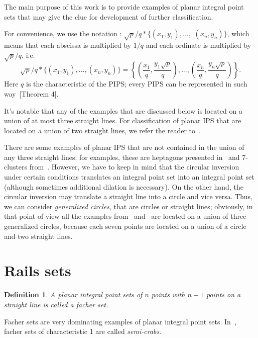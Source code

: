 \documentclass[12pt]{article}
\theoremstyle{theorem}
\theoremstyle{dfn}
\newtheorem{dfn}{Definition}
\theoremstyle{remark}
\begin{document}
The main purpose of this work is to provide examples of planar integral point sets
that may give the clue for development of further classification.

For convenience, we use the notation \cite{our-ped-2018,our-pmm-2018,our-vmmsh-2018}:
$\sqrt{p}/q * \{ (x_1,y_1), ...,$ $ (x_n, y_n)  \}$,
which means that each abscissa is multiplied by $1/q$
and each ordinate is multiplied by $\sqrt{p}/q$,  i.e.
\begin{equation}
	\label{eq:char_lattice}
	\sqrt{p}/q * \{ (x_1,y_1), ..., (x_n, y_n)  \}
	=
	\left\{ \left(\frac{x_1}{q},\frac{y_1\sqrt{p}}{q}\right), ..., \left(\frac{x_n}{q},   \frac{y_n\sqrt{p}}{q}\right)  \right\}
	.
\end{equation}
Here $q$ is the characteristic of the PIPS;
every PIPS can be represented in such way~\cite{our-vmmsh-2018-translit}[Theorem 4].

It's notable that any of the examples that are discussed below
is located on a union of at most three straight lines.
For classification of planar IPS that are located on a union of two straight lines,
we refer the reader to~\cite{avdeev2019particular}.

There are some examples of planar IPS that are not contained in the union of any three straight lines:
for examples, these are heptagons presented in~\cite{kreisel2008heptagon} and 7-clusters from~\cite{kurz2013constructing}.
However, we have to keep in mind that the circular inversion under certain conditions
translates an integral point set into an integral point set
(although sometimes additional dilation is necessary).
On the other hand, the circular inversion may translate a straight line into a circle and vice versa.
Thus, we can consider \emph{generalized circles}, that are circles or straight lines;
obviously, in that point of view all the examples from~\cite{kreisel2008heptagon} and~\cite{kurz2013constructing}
are located on a union of three generalized circles,
because each seven points are located on a union of a circle and two straight lines.




\section{Rails sets}

\begin{dfn}
	A planar integral point sets of $n$ points with $n-1$ points on a straight line is called
	a \textit{facher} set.
\end{dfn}
Facher sets are very dominating examples of planar integral point sets.
In~\cite{antonov2008maximal}, facher sets of characteristic 1 are called \textit{semi-crabs}.
\end{document}
